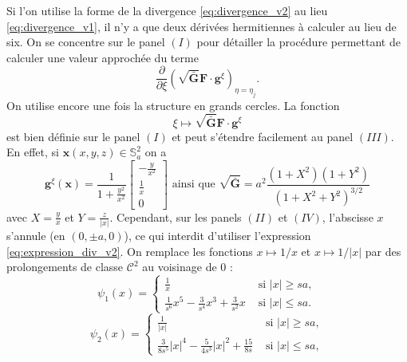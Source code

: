 Si l'on utilise la forme de la divergence \eqref{eq:divergence_v2} au lieu \eqref{eq:divergence_v1}, il n'y a que deux dérivées hermitiennes à calculer au lieu de six. 
On se concentre sur le panel $(I)$ pour détailler la procédure permettant de calculer une valeur approchée du terme
\begin{equation}
\dfrac{\partial}{\partial \xi} \left( \sqrt{\bar{\mathbf{G}}} \mathbf{F} \cdot \mathbf{g}^{\xi} \right)_{\eta = \eta_j}.
\end{equation}
On utilise encore une fois la structure en grands cercles. La fonction
\begin{equation}
\xi \mapsto \sqrt{\bar{\mathbf{G}}} \mathbf{F} \cdot \mathbf{g}^{\xi}
\end{equation}
est bien définie sur le panel $(I)$ et peut s'étendre facilement au panel $(III)$. En effet, si $\mathbf{x}(x,y,z) \in \mathbb{S}_a^2$ on a
\begin{equation}
\mathbf{g}^{\xi} (\mathbf{x} ) = \dfrac{1}{1 + \frac{y^2}{x^2}} \begin{bmatrix}
- \frac{y}{x^2} \\
\frac{1}{x} \\
0
\end{bmatrix} \text{ ainsi que } \sqrt{\bar{\mathbf{G}}} = a^2 \dfrac{(1+X^2)(1+Y^2)}{(1+X^2+Y^2)^{3/2}}
\label{eq:expression_div_v2}
\end{equation}
avec $X=\frac{y}{x}$ et $Y = \frac{z}{|x|}$.
Cependant, sur les panels $(II)$ et $(IV)$, l’abscisse $x$ s’annule (en $(0,\pm a,0)$), ce qui interdit d'utiliser l'expression \eqref{eq:expression_div_v2}.
On remplace les fonctions $x \mapsto 1/x$ et $x \mapsto 1/|x|$ par des prolongements de classe $\mathcal{C}^2$ au voisinage de $0$ :
\begin{equation}
\psi_1 (x) = \left\lbrace
\begin{array}{ll}
\frac{1}{x} & \text{ si } |x| \geq s a, \\
\frac{1}{s^6} x^5 - \frac{3}{s^4} x^3 + \frac{3}{s^2} x & \text{ si } |x| \leq s a.
\end{array}
\right.
\end{equation} 
\begin{equation}
\psi_2 (x) = \left\lbrace
\begin{array}{ll}
\frac{1}{|x|} & \text{ si } |x| \geq s a, \\
\frac{3}{8s^5} |x|^4 - \frac{5}{4s^3} |x|^2 + \frac{15}{8s} & \text{ si } |x| \leq s a,
\end{array}
\right.
\end{equation} 

